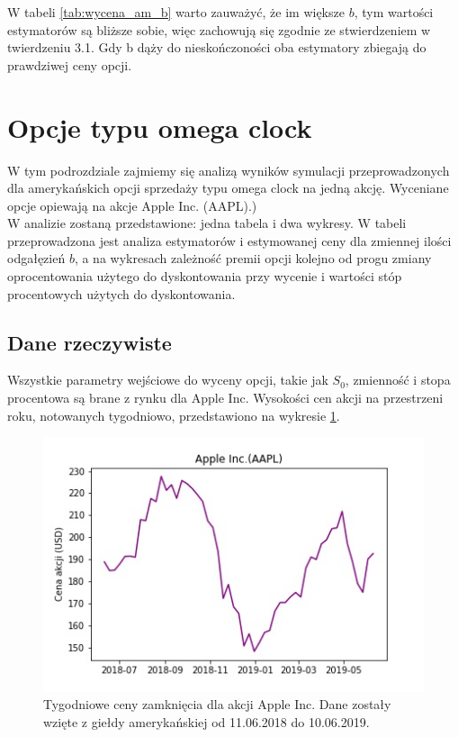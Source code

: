 \documentclass[]{pwr_wmat_praca_dyplomowa}
\theoremstyle{plain}
\numberwithin{theorem}{chapter}
\theoremstyle{definition}
\numberwithin{theorem}{chapter}
\begin{document}
\noindent W tabeli \ref{tab:wycena_am_b} warto zauważyć, że im większe $b$, tym wartości estymatorów są bliższe sobie, więc zachowują się zgodnie ze stwierdzeniem w twierdzeniu 3.1. Gdy b dąży do nieskończoności oba estymatory zbiegają do prawdziwej ceny opcji.

\section{Opcje typu omega clock}

W tym podrozdziale zajmiemy się analizą wyników symulacji przeprowadzonych dla amerykańskich opcji sprzedaży typu omega clock na jedną akcję. Wyceniane opcje opiewają na akcje Apple Inc. (AAPL).)\\

W analizie zostaną przedstawione: jedna tabela i dwa wykresy.  W tabeli przeprowadzona jest analiza estymatorów i estymowanej ceny dla zmiennej ilości odgałęzień $b$, a na wykresach zależność premii opcji kolejno od progu zmiany oprocentowania użytego do dyskontowania przy wycenie i wartości stóp procentowych użytych do dyskontowania.

\subsection{Dane rzeczywiste}
Wszystkie parametry wejściowe do wyceny opcji, takie jak $S_0$, zmienność i stopa procentowa są brane z rynku dla Apple Inc. Wysokości cen akcji na przestrzeni roku, notowanych tygodniowo, przedstawiono na wykresie \ref{fig:apple_akcje}.

\begin{figure}[h!]
\centering
\includegraphics[scale=1]{apple_akcje.jpg}
\caption{Tygodniowe ceny zamknięcia dla akcji Apple Inc. Dane zostały wzięte z giełdy amerykańskiej od 11.06.2018 do 10.06.2019.}
\label{fig:apple_akcje}
\end{figure}
 
\end{document}
